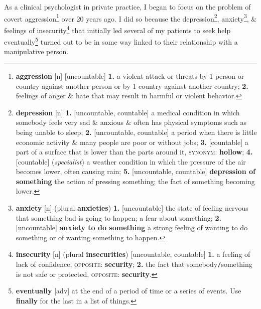 \documentclass[oneside]{book}
\numberwithin{equation}{section}
\begin{document}
As a clinical psychologist in private practice, I began to focus on the problem of covert aggression\footnote{\textbf{aggression} [n] [uncountable] \textbf{1.} a violent attack or threats by 1 person or country against another person or by 1 country against another country; \textbf{2.} feelings of anger \& hate that may result in harmful or violent behavior.} over 20 years ago. I did so because the depression\footnote{\textbf{depression} [n] \textbf{1.} [uncountable, countable] a medical condition in which somebody feels very sad \& anxious \& often has physical symptoms such as being unable to sleep; \textbf{2.} [uncountable, countable] a period when there is little economic activity \& many people are poor or without jobs; \textbf{3.} [countable] a part of a surface that is lower than the parts around it, \textsc{synonym}: \textbf{hollow}; \textbf{4.} [countable] (\textit{specialist}) a weather condition in which the pressure of the air becomes lower, often causing rain; \textbf{5.} [uncountable, countable] \textbf{depression of something} the action of pressing something; the fact of something becoming lower.}, anxiety\footnote{\textbf{anxiety} [n] (plural \textbf{anxieties}) \textbf{1.} [uncountable] the state of feeling nervous that something bad is going to happen; a fear about something; \textbf{2.} [uncountable] \textbf{anxiety to do something} a strong feeling of wanting to do something or of wanting something to happen.}, \& feelings of insecurity\footnote{\textbf{insecurity} [n] (plural \textbf{insecurities}) [uncountable, countable] \textbf{1.} a feeling of lack of confidence, \textsc{opposite}: \textbf{security}; \textbf{2.} the fact that somebody\texttt{/}something is not safe or protected, \textsc{opposite}: \textbf{security}.} that initially led several of my patients to seek help eventually\footnote{\textbf{eventually} [adv] at the end of a period of time or a series of events. Use \textbf{finally} for the last in a list of things.} turned out to be in some way linked to their relationship with a manipulative person.
\end{document}

